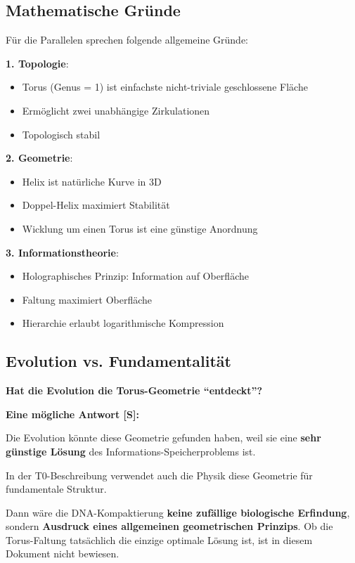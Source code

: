 	\subsection{Mathematische Gründe}

	Für die Parallelen sprechen folgende allgemeine Gründe:

	\textbf{1. Topologie}:
	\begin{itemize}
		\item Torus (Genus = 1) ist einfachste nicht-triviale geschlossene Fläche
		\item Ermöglicht zwei unabhängige Zirkulationen
		\item Topologisch stabil
	\end{itemize}

	\textbf{2. Geometrie}:
	\begin{itemize}
		\item Helix ist natürliche Kurve in 3D
		\item Doppel-Helix maximiert Stabilität
		\item Wicklung um einen Torus ist eine günstige Anordnung
	\end{itemize}

	\textbf{3. Informationstheorie}:
	\begin{itemize}
		\item Holographisches Prinzip: Information auf Oberfläche
		\item Faltung maximiert Oberfläche
		\item Hierarchie erlaubt logarithmische Kompression
	\end{itemize}

	\subsection{Evolution vs. Fundamentalität}

	\begin{revolutionary}
		\textbf{Hat die Evolution die Torus-Geometrie ``entdeckt''?}

		\vspace{0.3cm}

		\textbf{Eine mögliche Antwort \textbf{[S]}:}

		\vspace{0.3cm}

		Die Evolution könnte diese Geometrie gefunden haben, weil sie eine \textbf{sehr günstige Lösung} des Informations-Speicherproblems ist.

		\vspace{0.3cm}

		In der T0-Beschreibung verwendet auch die Physik diese Geometrie für fundamentale Struktur.

		\vspace{0.3cm}

		Dann wäre die DNA-Kompaktierung \textbf{keine zufällige biologische Erfindung}, sondern \textbf{Ausdruck eines allgemeinen geometrischen Prinzips}. Ob die Torus-Faltung tatsächlich die einzige optimale Lösung ist, ist in diesem Dokument nicht bewiesen.
	\end{revolutionary}

